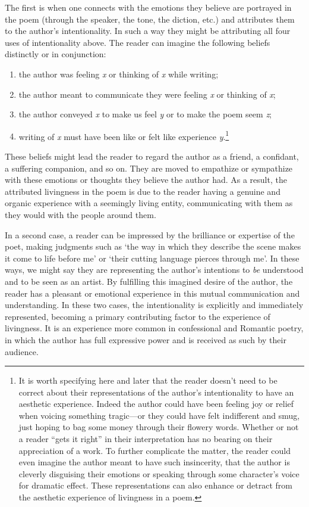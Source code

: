 The first is when one connects with the emotions they believe are
portrayed in the poem (through the speaker, the tone, the diction, etc.)
and attributes them to the author's intentionality. In such a way they
might be attributing all four uses of intentionality above. The reader
can imagine the following beliefs distinctly or in conjunction: 
	\begin{enumerate}
		\item the
author was feeling \emph{x} or thinking of \emph{x} while writing;
		\item the author meant to communicate they were feeling \emph{x} or thinking
of \emph{x};
		\item the author conveyed \emph{x} to make us feel \emph{y} or
to make the poem seem \emph{z};
		\item writing of \emph{x} must have been
like or felt like experience \emph{y}.\footnote{It is worth specifying
  here and later that the reader doesn't need to be correct about their
  representations of the author's intentionality to have an aesthetic
  experience. Indeed the author could have been feeling joy or relief
  when voicing something tragic---or they could have felt indifferent
  and smug, just hoping to bag some money through their flowery words.
  Whether or not a reader ``gets it right'' in their interpretation has
  no bearing on their appreciation of a work. To further complicate the
  matter, the reader could even imagine the author meant to have such
  insincerity, that the author is cleverly disguising their emotions or
  speaking through some character's voice for dramatic effect. These
  representations can also enhance or detract from the aesthetic
  experience of livingness in a poem.}
	\end{enumerate}
These beliefs might lead the
reader to regard the author as a friend, a confidant, a suffering
companion, and so on. They are moved to empathize or sympathize with
these emotions or thoughts they believe the author had. As a result, the
attributed livingness in the poem is due to the reader having a genuine
and organic experience with a seemingly living entity, communicating
with them as they would with the people around them.

In a second case, a reader can be impressed by the brilliance or
expertise of the poet, making judgments such as `the way in which they
describe the scene makes it come to life before me' or `their cutting
language pierces through me'. In these ways, we might say they are
representing the author's intentions to \emph{be} understood and to be
seen as an artist. By fulfilling this imagined desire of the author, the
reader has a pleasant or emotional experience in this mutual
communication and understanding. In these two cases, the intentionality
is explicitly and immediately represented, becoming a primary
contributing factor to the experience of livingness. It is an experience
more common in confessional and Romantic poetry, in which the author has
full expressive power and is received as such by their audience.

